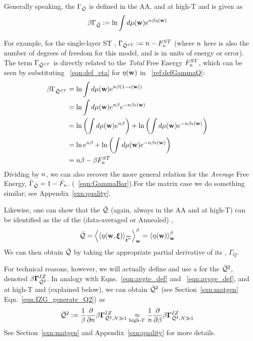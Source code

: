 Generally speaking, the \Quality \GeneratingFunction $\Gamma_{\bar{\mathcal{Q}}}$ is defined in the AA, and at high-T and is given as
\begin{align}
  \label{ref:defGammaQ}
  \beta\Gamma_{\bar{\mathcal{Q}}} := \ln\int d\mu({\mathbf{w}}) e^{n\beta\eta({\mathbf{w}})}
\end{align}

For example, for the single-layer ST \Perceptron, $\Gamma_{\bar{\mathcal{Q}}^{ST}}:=n-F^{ST}_{n}$
(where $n$ here is also the number of degrees of freedom for this model, and is in units of energy or error).
The term $\Gamma_{\bar{\mathcal{Q}}^{ST}}$ is directly related to the \emph{Total} Free Energy $F^{ST}_{n}$, which can be seen by substituting \EQN~\ref{eqn:def_eta}
for $\eta({\mathbf{w}})$ in \EQN~\ref{ref:defGammaQ}:
\begin{align}
  \label{ref:defGammaQtoF}
  \beta\Gamma_{\bar{\mathcal{Q}}^{ST}}
  &= \ln\int d\mu({\mathbf{w}}) e^{n\beta(1-\epsilon({\mathbf{w}}))} \nonumber \\
    &= \ln\int d\mu({\mathbf{w}}) e^{n\beta}e^{-n\beta\epsilon({\mathbf{w}})} \nonumber \\
    &= \ln\left(\int d\mu({\mathbf{w}}) e^{n\beta}\right)+\ln\left(\int d\mu({\mathbf{w}})e^{-n\beta\epsilon({\mathbf{w}})}\right) \nonumber \\
   &= \ln e^{n\beta}+\ln\left(\int d\mu({\mathbf{w}})e^{-n\beta\epsilon({\mathbf{w}})}\right) \nonumber \\
  &= n\beta -\beta F^{ST}_{n}
\end{align}
Dividing by $n$, we can also recover the more general relation for the \emph{Average} Free Energy,
$\bar{\Gamma}_{\bar{\mathcal{Q}}}=1-\bar{F}_{n}$. (\EQN~\ref{eqn:GammaBar}).For the matrix case we do something similar; see Appendix~\ref{sxn:quality}.

Likewise, one can show that the \Quality $\bar{\mathcal{Q}}$
(again, always in the AA and at high-T) can be identified as the \ThermalAverage of the (data-averaged or Annealed)
\SelfOverlap, 
\begin{align}
  \label{eqn:Q_def_eta}
  \Q = \THRMAVGw{\langle\ETA(\WVEC,\XI)\rangle_{\AVGNDXIn}} =\THRMAVGw{\ETA(\WVEC)}
\end{align}
We can then obtain $\bar{\mathcal{Q}}$ by taking the appropriate partial derivative of its \GeneratingFunction, $\Gamma_{Q}$.

For technical reasons, however, we will actually define and use a
\GeneratingFunction for the \AverageLayerQualitySquared $\bar{\mathcal{Q}}^{2}$, denoted $\beta\mathbf{\Gamma}^{IZ}_{\bar{\mathcal{Q}}^{2}}$.
In analogy with Eqns.~\ref{eqn:avgte_def} and ~\ref{eqn:avgge_def}, and at high-T and \LargeN (explained below),
we can obtain $\bar{\mathcal{Q}}^{2}$ (see Section~\ref{sxn:matgen} Eqn.~\ref{eqn:IZG_generate_Q2}) as
\begin{align}
  \label{eqn:QT_def}
  \bar{\mathcal{Q}}^{2} := \frac{1}{\beta}\frac{\partial }{\partial n}\beta\mathbf{\Gamma}^{IZ}_{\bar{\mathcal{Q}}^{2},N\gg 1}
  \underset{\text{high-}T}{\approx}
\frac{1}{n}\frac{\partial }{\partial \beta}\beta\mathbf{\Gamma}^{IZ}_{\bar{\mathcal{Q}}^{2},N\gg 1}
\end{align}
See Section~\ref{sxn:matgen} and Appendix~\ref{sxn:quality} for more details.

